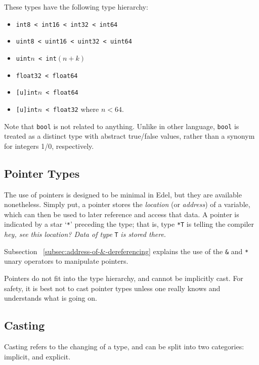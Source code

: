 \documentclass{article}
\begin{document}

    These types have the following type hierarchy:
    \begin{itemize}
        \item \texttt{int8 < int16 < int32 < int64}
        \item \texttt{uint8 < uint16 < uint32 < uint64}
        \item \texttt{uint\(n\) < int\((n+k)\)}
        \item \texttt{float32 < float64}
        \item \texttt{[u]int\(n\) < float64}
        \item \texttt{[u]int\(n\) < float32} where \(n < 64\).
    \end{itemize}

    Note that \texttt{bool} is not related to anything.
    Unlike in other language, \texttt{bool} is treated as a distinct type with abstract true/false values, rather than a synonym for integers 1/0, respectively.

    \subsection{Pointer Types}\label{subsec:pointer-types}

    The use of pointers is designed to be minimal in Edel, but they are available nonetheless.
    Simply put, a pointer stores the \textit{location} (or \textit{address}) of a variable, which can then be used to later reference and access that data.
    A pointer is indicated by a star `\texttt{*}' preceding the type;
    that is, type \texttt{*T} is telling the compiler \textit{hey, see this location? Data of type} \texttt{T} \textit{is stored there}.

    Subsection ~\ref{subsec:address-of-&-dereferencing} explains the use of the \texttt{\&} and \texttt{*} unary operators to manipulate pointers.

    Pointers do not fit into the type hierarchy, and cannot be implicitly cast.
    For safety, it is best not to cast pointer types unless one really knows and understands what is going on.

    \subsection{Casting}\label{subsec:type-casting}

    Casting refers to the changing of a type, and can be split into two categories: implicit, and explicit.
\end{document}

